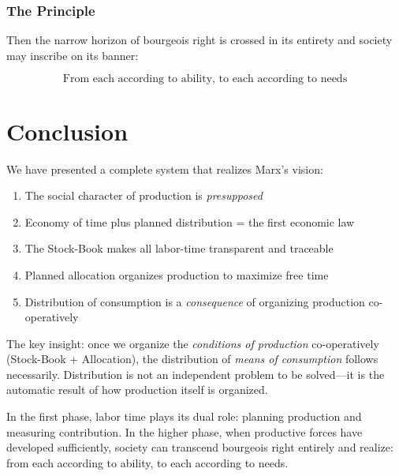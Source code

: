 \documentclass[12pt,a4paper]{article}
\begin{document}
\subsubsection{The Principle}

Then the narrow horizon of bourgeois right is crossed in its entirety and society may inscribe on its banner:

\begin{equation}
\boxed{\text{From each according to ability, to each according to needs}}
\end{equation}

\section{Conclusion}

We have presented a complete system that realizes Marx's vision:

\begin{enumerate}
\item The social character of production is \textit{presupposed}
\item Economy of time plus planned distribution = the first economic law
\item The Stock-Book makes all labor-time transparent and traceable
\item Planned allocation organizes production to maximize free time
\item Distribution of consumption is a \textit{consequence} of organizing production co-operatively
\end{enumerate}

The key insight: once we organize the \textit{conditions of production} co-operatively (Stock-Book + Allocation), the distribution of \textit{means of consumption} follows necessarily. Distribution is not an independent problem to be solved—it is the automatic result of how production itself is organized.

In the first phase, labor time plays its dual role: planning production and measuring contribution. In the higher phase, when productive forces have developed sufficiently, society can transcend bourgeois right entirely and realize: from each according to ability, to each according to needs.
\end{document}
